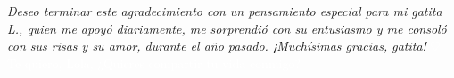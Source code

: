 \begin{acknowledgements}
\vfill{}

%
%
    \emph{Deseo terminar este agradecimiento con un pensamiento especial para mi gatita \emph{L.}, quien me apoyó diariamente, me sorprendió con su entusiasmo y me consoló con sus risas y su amor, durante el año pasado. ¡Muchísimas gracias, gatita!}
    \textcolor{white}{$\heartsuit$ Te quiero, Lola, ¿Quieres compartir tu vida conmigo?}

\end{acknowledgements}

